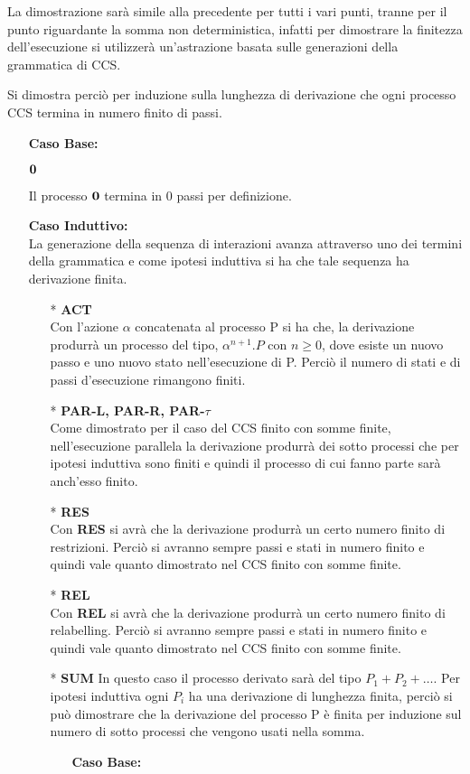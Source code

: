 La dimostrazione sarà simile alla precedente per tutti i vari punti, tranne per il punto riguardante la somma non deterministica, infatti per dimostrare la finitezza dell'esecuzione si utilizzerà un'astrazione basata sulle generazioni della grammatica di CCS.

Si dimostra perciò per induzione sulla lunghezza di derivazione che ogni processo CCS termina in numero finito di passi.

\begin{itemize}
	\item[] \textbf{Caso Base:} \mbox{}
	
	$\mathbf{0}$
	
	Il processo $\mathbf{0}$ termina in 0 passi per definizione.
	\\
	\item[] \textbf{Caso Induttivo:} \mbox{}
	\\
	La generazione della sequenza di interazioni avanza attraverso uno dei termini della grammatica e come ipotesi induttiva si ha che tale sequenza ha derivazione finita.
	\begin{itemize}
		
		\item[*] \textbf{ACT}
		\\
		Con l'azione $\alpha$ concatenata al processo P si ha che, la derivazione produrrà un processo del tipo, \(\alpha^{n+1}.P\) con \(n \geq 0\), dove esiste un nuovo passo e uno nuovo stato nell'esecuzione di P. Perciò il numero di stati e di passi d'esecuzione rimangono finiti.
		\\
		\item[*] \textbf{PAR-L, PAR-R, PAR-$\tau$}
		\\
		Come dimostrato per il caso del CCS finito con somme finite, nell'esecuzione parallela la derivazione produrrà dei sotto processi che per ipotesi induttiva sono finiti e quindi il processo di cui fanno parte sarà anch'esso finito.
		\\
		\item[*] \textbf{RES}
		\\
		Con \textbf{RES} si avrà che la derivazione produrrà un certo numero finito di restrizioni. Perciò si avranno sempre passi e stati in numero finito e quindi vale quanto dimostrato nel CCS finito con somme finite.
		\\
		\item[*] \textbf{REL}
		\\
		Con \textbf{REL} si avrà che la derivazione produrrà un certo numero finito di relabelling. Perciò si avranno sempre passi e stati in numero finito e quindi vale quanto dimostrato nel CCS finito con somme finite.
		\\
		\item[*] \textbf{SUM}
		In questo caso il processo derivato sarà del tipo \(P_1+P_2+\ldots\). Per ipotesi induttiva ogni \(P_i\) ha una derivazione di lunghezza finita, perciò si può dimostrare che la derivazione del processo P è finita per induzione sul numero di sotto processi che vengono usati nella somma. \\
		\begin{itemize}
			\item[] \textbf{Caso Base:} \mbox{}
			

\end{itemize}
\end{itemize}
\end{itemize}
